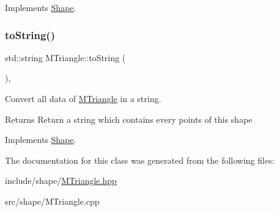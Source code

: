 Implements \hyperlink{classShape_a2dea8616fd40f2d69fd208715921982a}{Shape}.

\mbox{\label{classMTriangle_a7d1fd825592dffa6ac05b3398a8c105a}} 
\subsubsection{\texorpdfstring{to\+String()}{toString()}}
{\footnotesize\ttfamily std\+::string M\+Triangle\+::to\+String (\begin{DoxyParamCaption}{ }\end{DoxyParamCaption})\hspace{0.3cm}{\ttfamily [override]}, {\ttfamily [virtual]}}



Convert all data of \hyperlink{classMTriangle}{M\+Triangle} in a string. 

\begin{DoxyReturn}{Returns}
Return a string which contains every points of this shape 
\end{DoxyReturn}


Implements \hyperlink{classShape_a98fa87c6dc4c7045fd6897a8f3bc186c}{Shape}.



The documentation for this class was generated from the following files\+:\begin{DoxyCompactItemize}
\item 
include/shape/\hyperlink{MTriangle_8hpp}{M\+Triangle.\+hpp}\item 
src/shape/M\+Triangle.\+cpp\end{DoxyCompactItemize}

